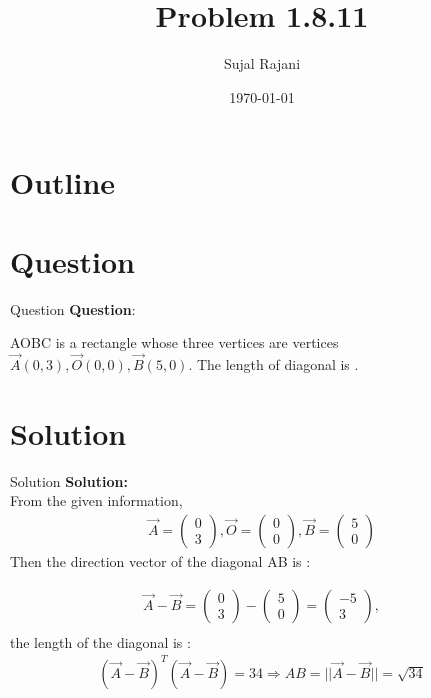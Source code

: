 \documentclass{beamer}
\title{Problem 1.8.11}
\author{Sujal Rajani}
\date{\today}
\theoremstyle{remark}
\newcommand{\myvec}[1]{\ensuremath{\begin{pmatrix}#1\end{pmatrix}}}
\numberwithin{equation}{section}
\begin{document}
\begin{frame}
\titlepage
\end{frame}

\section*{Outline}
\begin{frame}
\tableofcontents
\end{frame}
\section{Question}
\begin{frame}{Question}
\textbf{Question}:


\noindent AOBC is a rectangle whose three vertices are vertices $\vec{A}(0,3),\vec{O}(0,0),\vec{B}(5,0)$. The 
length of diagonal is \underline{\hspace{2cm}}.   

\end{frame}

    

\section{Solution}
\begin{frame}{Solution}
\textbf{Solution:} 
\\
From the given information,
\begin{align}
		\vec{A} = \myvec{0\\3},\vec{O} = \myvec{0\\0},\vec{B} = \myvec{5\\0} 
\end{align}
Then the direction vector  of the diagonal AB is :

\begin{align}
    \vec{A}-\vec{B}=\myvec{0\\3}-\myvec{5\\0}=\myvec{-5\\3},
    \\
  \end{align}
the length of the diagonal is :
\begin{align}
    (\vec{A}-\vec{B})^T(\vec{A}-\vec{B})=34    
     \Rightarrow AB=||\vec{A}-\vec{B}||=\sqrt{34}	 
    \end{align}
    \end{frame}
\end{document}
